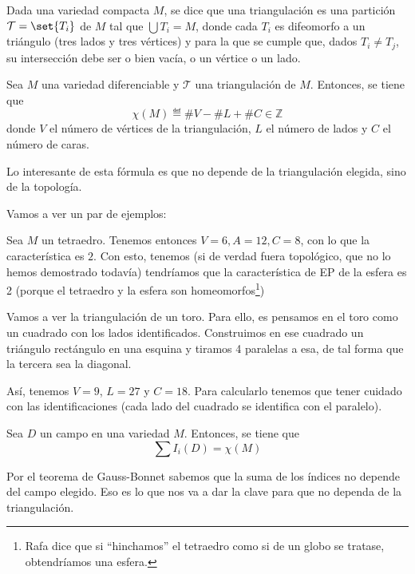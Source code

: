 \begin{defn}[Triangulación] Dada una variedad compacta $M$, se dice que una triangulación es una partición $\mathcal{T} = \set{T_i}$ de $M$ tal que $\bigcup T_i = M$, donde cada $T_i$ es difeomorfo a un triángulo (tres lados y tres vértices) y para la que se cumple que, dados $T_i ≠ T_j$, su intersección debe ser o bien vacía, o un vértice o un lado.
\end{defn}

\begin{defn}
Sea $M$ una variedad diferenciable y $\mathcal{T}$ una triangulación de $M$. Entonces, se tiene que \[ \chi(M) ≝ \#V - \#L + \#C ∈ℤ \] donde $V$ el número de vértices de la triangulación, $L$ el número de lados y $C$ el número de caras.
\end{defn}

Lo interesante de esta fórmula es que no depende de la triangulación elegida, sino de la topología.

Vamos a ver un par de ejemplos:

\begin{example}
Sea $M$ un tetraedro. Tenemos entonces $V=6,A=12,C=8$, con lo que la característica es $2$. Con esto, tenemos (si de verdad fuera topológico, que no lo hemos demostrado todavía) tendríamos que la característica de EP de la esfera es 2 (porque el tetraedro y la esfera son homeomorfos\footnote{Rafa dice que si ``hinchamos'' el tetraedro como si de un globo se tratase, obtendríamos una esfera.})
\end{example}

\begin{example}

Vamos a ver la triangulación de un toro. Para ello, es pensamos en el toro como un cuadrado con los lados identificados. Construimos en ese cuadrado un triángulo rectángulo en una esquina y tiramos 4 paralelas a esa, de tal forma que la tercera sea la diagonal.

Así, tenemos $V=9$, $L=27$ y $C=18$. Para calcularlo tenemos que tener cuidado con las identificaciones (cada lado del cuadrado se identifica con el paralelo).
\end{example}


\begin{theorem}
Sea $D$ un campo en una variedad $M$. Entonces, se tiene que \[ \sum I_i(D) = χ(M) \]
\end{theorem}

Por el teorema de Gauss-Bonnet sabemos que la suma de los índices no depende del campo elegido. Eso es lo que nos va a dar la clave para que no dependa de la triangulación.

